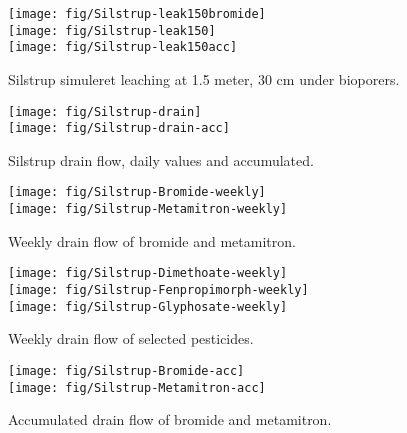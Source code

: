 \begin{figure}[htbp]
  \begin{center}
    \texttt{[image: fig/Silstrup-leak150bromide]}\\
    \texttt{[image: fig/Silstrup-leak150]}\\
    \texttt{[image: fig/Silstrup-leak150acc]}
  \end{center}
  \caption{Silstrup simuleret leaching at 1.5 meter, 30 cm under bioporers.}
  \label{fig:Silstrup-leak150}
\end{figure}\FloatBarrier

\begin{figure}[htbp]
  \begin{center}
    \texttt{[image: fig/Silstrup-drain]}\\
    \texttt{[image: fig/Silstrup-drain-acc]}
  \end{center}
  \caption{Silstrup drain flow, daily values and accumulated.}
  \label{fig:Silstrup-drain}
\end{figure}\FloatBarrier

\begin{figure}[htbp]
  \begin{center}
    \texttt{[image: fig/Silstrup-Bromide-weekly]}\\
    \texttt{[image: fig/Silstrup-Metamitron-weekly]}
  \end{center}
  \caption{Weekly drain flow of bromide and metamitron.}
  \label{fig:Silstrup-weekly}
\end{figure}\FloatBarrier

\begin{figure}[htbp]
  \begin{center}
    \texttt{[image: fig/Silstrup-Dimethoate-weekly]}\\
    \texttt{[image: fig/Silstrup-Fenpropimorph-weekly]}\\
    \texttt{[image: fig/Silstrup-Glyphosate-weekly]}
  \end{center}
  \caption{Weekly drain flow of selected pesticides.}
  \label{fig:Silstrup-weekly2}
\end{figure}\FloatBarrier

\begin{figure}[htbp]
  \begin{center}
    \texttt{[image: fig/Silstrup-Bromide-acc]}\\
    \texttt{[image: fig/Silstrup-Metamitron-acc]}
  \end{center}
  \caption{Accumulated drain flow of bromide and metamitron.}
  \label{fig:Silstrup-bromide-acc}
\end{figure}\FloatBarrier

